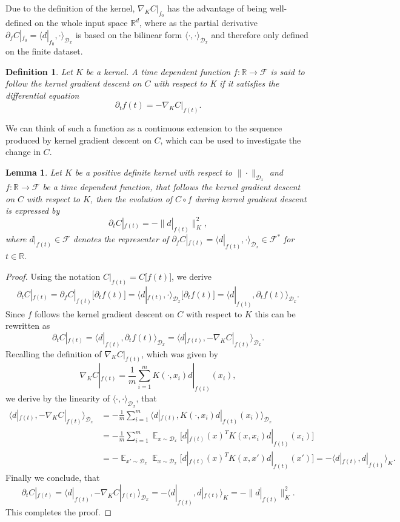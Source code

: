 \documentclass[11pt, a4paper]{article}
\newtheorem{lemma}[theorem]{Lemma}
\newtheorem{definition}[theorem]{Definition}
\newcommand{\R}{\mathds{R}}
\newcommand{\D}{\mathcal{D}}
\newcommand{\F}{\mathcal{F}}
\DeclareMathOperator*{\E}{\mathds{E}}
\begin{document}
Due to the definition of the kernel, $\nabla_KC|_{f_0}$ has the advantage of being well-defined on the whole input space $\R^d$, where as the partial derivative $\partial_fC|_{f_0} =\langle d|_{f_0}, \cdot \rangle_{\D_x}$ is based on the bilinear form $\langle \cdot, \cdot \rangle_{\D_x}$ and therefore only defined on the finite dataset.

\begin{definition}
Let $K$ be a kernel. A time dependent function $f : \R \to \F$ is said to follow the kernel gradient descent on $C$ with respect to K if it satisfies the differential equation
\[ \partial_tf(t) = - \nabla_KC|_{f(t)}. \]
\end{definition}

We can think of such a function as a continuous extension to the sequence produced by kernel gradient descent on $C$, which can be used to investigate the change in $C$.

\begin{lemma}
Let $K$ be a positive definite kernel with respect to $\| \cdot \|_{\D_x}$ and $f: \R \to \F$ be a time dependent function, that follows the kernel gradient descent on $C$ with respect to $K$, then the evolution of $C \circ f$ during kernel gradient descent is expressed by
\[ \partial_tC|_{f(t)} = - \big \| d|_{f(t)} \big \|_{K}^2, \]
where $d|_{f(t)} \in \F$ denotes the representer of $\partial_f C|_{f(t)} = \big \langle d|_{f(t)}, \cdot \big \rangle_{\D_x} \in \F^*$ for $t \in \R$.
\end{lemma}

\begin{proof}
Using the notation $C|_{f(t)} = C \big [f(t) \big ]$, we derive
\[ \partial_tC|_{f(t)} = \partial_f C|_{f(t)} \big [ \partial_t f(t) \big ] = \big \langle d|_{f(t)}, \cdot \big \rangle_{\D_x} \big [ \partial_t f(t) \big ] = \big \langle d|_{f(t)}, \partial_t f(t) \big \rangle_{\D_x}. \]
Since $f$ follows the kernel gradient descent on $C$ with respect to $K$ this can be rewritten as
\[ \partial_tC|_{f(t)} = \big \langle d|_{f(t)}, \partial_t f(t) \big \rangle_{\D_x} = \big \langle d|_{f(t)}, - \nabla_K C|_{f(t)} \big \rangle_{\D_x}. \]
Recalling the definition of $\nabla_K C|_{f(t)}$, which was given by
\[ \nabla_KC|_{f(t)} = \frac{1}{m} \sum_{i=1}^{m} K(\cdot,x_i)d|_{f(t)}(x_i), \]
we derive by the linearity of $\langle \cdot, \cdot \rangle_{\D_x}$, that
\[ \begin{split} 
\big \langle d|_{f(t)}, - \nabla_K C|_{f(t)} \big \rangle_{\D_x} 
&= - \frac{1}{m} \sum_{i=1}^{m} \big \langle d|_{f(t)}, K(\cdot,x_i)d|_{f(t)}(x_i) \big \rangle_{\D_x} \\\
&= - \frac{1}{m} \sum_{i=1}^{m} \E_{x \sim \D_x} \Big [ d|_{f(t)}(x)^TK(x,x_i)d|_{f(t)}(x_i) \Big ] \\\
&= - \E_{x' \sim \D_x} \E_{x \sim \D_x} \Big [ d|_{f(t)}(x)^TK(x,x')d|_{f(t)}(x') \Big ]
= - \big \langle d|_{f(t)}, d|_{f(t)} \big \rangle_{K}.
\end{split} \]
Finally we conclude, that
\[ \partial_tC|_{f(t)} = \big \langle d|_{f(t)}, - \nabla_K C|_{f(t)} \big \rangle_{\D_x} = - \big \langle d|_{f(t)}, d|_{f(t)} \big \rangle_{K} = - \big \| d|_{f(t)} \big \|_{K}^2. \]
This completes the proof.
\end{proof}
\end{document}
